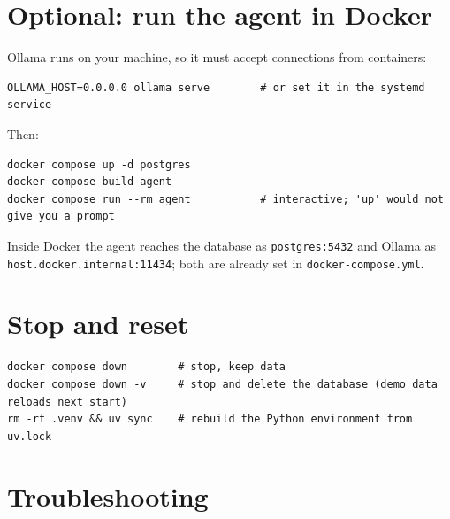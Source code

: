 \documentclass[11pt,a4paper]{article}
\begin{document}
\section{Optional: run the agent in Docker}
\label{sec:docker}

Ollama runs on your machine, so it must accept connections from containers:

\begin{lstlisting}
OLLAMA_HOST=0.0.0.0 ollama serve        # or set it in the systemd service
\end{lstlisting}

Then:

\begin{lstlisting}
docker compose up -d postgres
docker compose build agent
docker compose run --rm agent           # interactive; 'up' would not give you a prompt
\end{lstlisting}

Inside Docker the agent reaches the database as \texttt{postgres:5432} and
Ollama as \texttt{host.docker.internal:11434}; both are already set in
\texttt{docker-compose.yml}.

\section{Stop and reset}

\begin{lstlisting}
docker compose down        # stop, keep data
docker compose down -v     # stop and delete the database (demo data reloads next start)
rm -rf .venv && uv sync    # rebuild the Python environment from uv.lock
\end{lstlisting}

\section{Troubleshooting}
\end{document}

